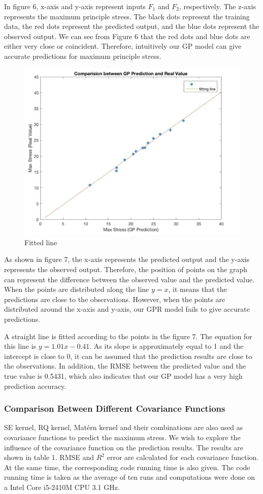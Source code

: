 \documentclass[conference]{IEEEtran}
\begin{document}
In figure 6, x-axis and y-axis represent inputs $F_1$ and $F_2$, respectively. The z-axis represents the maximum principle stress. The black dots represent the training data, the red dots represent the predicted output, and the blue dots represent the observed output. We can see from Figure 6 that the red dots and blue dots are either very close or coincident. Therefore, intuitively our GP model can give accurate predictions for maximum principle stress.

\begin{figure} 
\centering
\includegraphics[width=3.4 in,height=2.5 in]{14-2.png}
\caption{Fitted line}
\label{fig:graph}
\end{figure}

As shown in figure 7, the x-axis represents the predicted output and the y-axis represents the observed output. Therefore, the position of points on the graph can represent the difference between the observed value and the predicted value. When the points are distributed along the line $y=x$, it means that the predictions are close to the observations. However, when the points are distributed around the x-axis and y-axis, our GPR model fails to give accurate predictions. 

A straight line is fitted according to the points in the figure 7. The equation for this line is $y =    1.01 x-0.41$. As its slope is approximately equal to 1 and the intercept is close to 0, it can be assumed that the prediction results are close to the observations. In addition, the RMSE between the predicted value and the true value is 0.5431, which also indicates that our GP model has a very high prediction accuracy.


\subsubsection{Comparison Between Different Covariance Functions}
SE kernel, RQ kernel, Matérn kernel and their combinations are also used as covariance functions to predict the maximum stress. We wish to explore the influence of the covariance function on the prediction results. The results are shown in table 1. RMSE and $R^2$ error are calculated for each covariance function. At the same time, the corresponding code running time is also given. The code running time is taken as the average of ten runs and computations were done on a Intel Core i5-2410M CPU 3.1 GHz.
\end{document}
